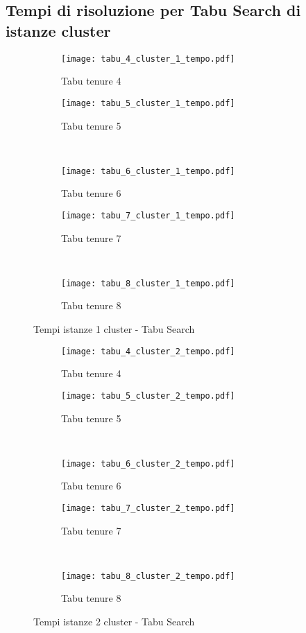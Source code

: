 \subsection{Tempi di risoluzione per Tabu Search di istanze cluster}

\begin{figure}[H]
	\centering
	\begin{subfigure}[b]{.45\textwidth}
		\texttt{[image: tabu\_4\_cluster\_1\_tempo.pdf]}
		\caption{Tabu tenure 4}
	\end{subfigure}
	\quad
	\begin{subfigure}[b]{.45\textwidth}
		\texttt{[image: tabu\_5\_cluster\_1\_tempo.pdf]}
		\caption{Tabu tenure 5}
	\end{subfigure}
	\\
	\begin{subfigure}[b]{.45\textwidth}
		\texttt{[image: tabu\_6\_cluster\_1\_tempo.pdf]}
		\caption{Tabu tenure 6}
	\end{subfigure}
	\quad
	\begin{subfigure}[b]{.45\textwidth}
		\texttt{[image: tabu\_7\_cluster\_1\_tempo.pdf]}
		\caption{Tabu tenure 7}
	\end{subfigure}
	\\
	\begin{subfigure}[b]{.45\textwidth}
		\texttt{[image: tabu\_8\_cluster\_1\_tempo.pdf]}
		\caption{Tabu tenure 8}
	\end{subfigure}
	\caption{Tempi istanze 1 cluster - Tabu Search}
	\label{fig:tempi tabu cluster 1}
\end{figure}

\begin{figure}[H]
	\centering
	\begin{subfigure}[b]{.45\textwidth}
		\texttt{[image: tabu\_4\_cluster\_2\_tempo.pdf]}
		\caption{Tabu tenure 4}
	\end{subfigure}
	\quad
	\begin{subfigure}[b]{.45\textwidth}
		\texttt{[image: tabu\_5\_cluster\_2\_tempo.pdf]}
		\caption{Tabu tenure 5}
	\end{subfigure}
	\\
	\begin{subfigure}[b]{.45\textwidth}
		\texttt{[image: tabu\_6\_cluster\_2\_tempo.pdf]}
		\caption{Tabu tenure 6}
	\end{subfigure}
	\quad
	\begin{subfigure}[b]{.45\textwidth}
		\texttt{[image: tabu\_7\_cluster\_2\_tempo.pdf]}
		\caption{Tabu tenure 7}
	\end{subfigure}
	\\
	\begin{subfigure}[b]{.45\textwidth}
		\texttt{[image: tabu\_8\_cluster\_2\_tempo.pdf]}
		\caption{Tabu tenure 8}
	\end{subfigure}
	\caption{Tempi istanze 2 cluster - Tabu Search}
	\label{fig:tempi tabu cluster 2}
\end{figure}

